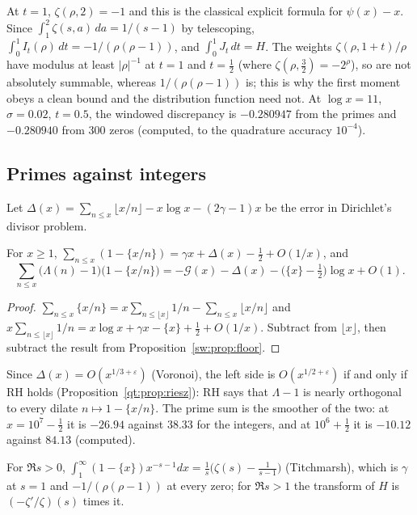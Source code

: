 At $t=1$, $\zeta(\rho,2)=-1$ and this is the classical explicit formula for $\psi(x)-x$. Since $\int_1^2\zeta(s,a)\,da=1/(s-1)$ by telescoping, $\int_0^1I_t(\rho)\,dt=-1/(\rho(\rho-1))$, and $\int_0^1J_t\,dt=H$. The weights $\zeta(\rho,1+t)/\rho$ have modulus at least $|\rho|^{-1}$ at $t=1$ and $t=\frac12$ (where $\zeta(\rho,\frac32)=-2^\rho$), so are not absolutely summable, whereas $1/(\rho(\rho-1))$ is; this is why the first moment obeys a clean bound and the distribution function need not. At $\log x=11$, $\sigma=0.02$, $t=0.5$, the windowed discrepancy is $-0.280947$ from the primes and $-0.280940$ from $300$ zeros (computed, to the quadrature accuracy $10^{-4}$).

\subsection{Primes against integers}

Let $\Delta(x)=\sum_{n\le x}\lfloor x/n\rfloor-x\log x-(2\gamma-1)x$ be the error in Dirichlet's divisor problem.

\begin{proposition}\label{sw:prop:div}
For $x\ge1$, $\sum_{n\le x}(1-\{x/n\})=\gamma x+\Delta(x)-\tfrac12+O(1/x)$, and
\[
\sum_{n\le x}\bigl(\Lambda(n)-1\bigr)\bigl(1-\{x/n\}\bigr)=-\mathcal G(x)-\Delta(x)-\bigl(\{x\}-\tfrac12\bigr)\log x+O(1).
\]
\end{proposition}

\begin{proof}
$\sum_{n\le x}\{x/n\}=x\sum_{n\le\lfloor x\rfloor}1/n-\sum_{n\le x}\lfloor x/n\rfloor$ and $x\sum_{n\le\lfloor x\rfloor}1/n=x\log x+\gamma x-\{x\}+\tfrac12+O(1/x)$. Subtract from $\lfloor x\rfloor$, then subtract the result from Proposition~\ref{sw:prop:floor}.
\end{proof}

Since $\Delta(x)=O(x^{1/3+\varepsilon})$ (Voronoi), the left side is $O(x^{1/2+\varepsilon})$ if and only if RH holds (Proposition~\ref{qt:prop:riesz}): RH says that $\Lambda-1$ is nearly orthogonal to every dilate $n\mapsto1-\{x/n\}$. The prime sum is the smoother of the two: at $x=10^7-\frac12$ it is $-26.94$ against $38.33$ for the integers, and at $10^6+\frac12$ it is $-10.12$ against $84.13$ (computed).

\begin{remark}\label{sw:rem:mellin}
For $\Re s>0$, $\int_1^\infty(1-\{x\})x^{-s-1}dx=\frac1s\bigl(\zeta(s)-\frac1{s-1}\bigr)$ (Titchmarsh), which is $\gamma$ at $s=1$ and $-1/(\rho(\rho-1))$ at every zero; for $\Re s>1$ the transform of $H$ is $(-\zeta'/\zeta)(s)$ times it.
\end{remark}

